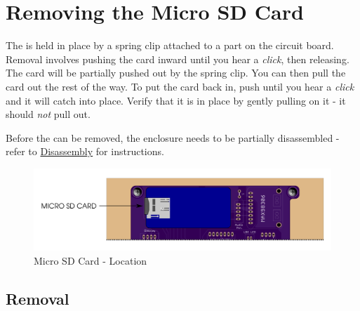 \chapter{Removing the Micro SD Card} \label{Removing SD Card}


The  is held in place by a spring clip attached to a part on the circuit
board.  Removal involves pushing the card inward until you hear a
\textit{click}, then releasing.  The card will be partially pushed out by the
spring clip.  You can then pull the card out the rest of the way.  To put the
card back in, push until you hear a \textit{click} and it will catch into place.
Verify that it is in place by gently pulling on it - it should \textit{not} pull
out.

\par\medskip

Before the  can be removed, the enclosure needs to be partially
disassembled - refer to \hyperref[Disassembly]{Disassembly} for instructions.


\begin{figure}[H]
\centering
  \includegraphics{images/micro_sd_card.png}
\caption{Micro SD Card - Location}
\end{figure}

\section{Removal} \label{SD Removal}

